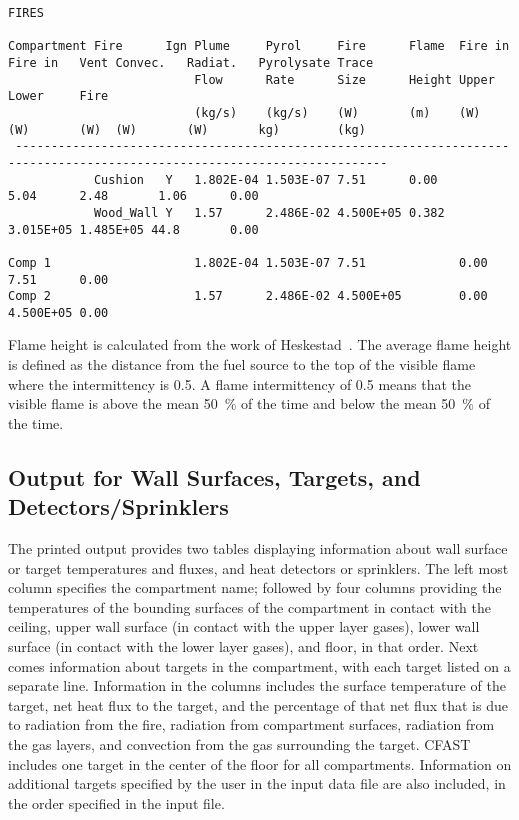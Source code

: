 \begin{lstlisting}[basicstyle=\tiny]
FIRES

Compartment Fire      Ign Plume     Pyrol     Fire      Flame  Fire in Fire in   Vent Convec.   Radiat.   Pyrolysate Trace
                          Flow      Rate      Size      Height Upper   Lower     Fire
                          (kg/s)    (kg/s)    (W)       (m)    (W)     (W)       (W)  (W)       (W)       kg)        (kg)
 --------------------------------------------------------------------------------------------------------------------------
            Cushion   Y   1.802E-04 1.503E-07 7.51      0.00                          5.04      2.48       1.06      0.00
            Wood_Wall Y   1.57      2.486E-02 4.500E+05 0.382                         3.015E+05 1.485E+05 44.8       0.00

Comp 1                    1.802E-04 1.503E-07 7.51             0.00    7.51      0.00
Comp 2                    1.57      2.486E-02 4.500E+05        0.00    4.500E+05 0.00
\end{lstlisting}
Flame height is calculated from the work of Heskestad~\cite{Heskestad:2002}. The average flame height is defined as the distance from the fuel source to the top of the visible flame where the intermittency is 0.5.  A flame intermittency of 0.5 means that the visible flame is above the mean 50~\% of the time and below the mean 50~\% of the time.

\subsection{Output for Wall Surfaces, Targets, and Detectors/Sprinklers}

The printed output provides two tables displaying information about wall surface or target temperatures and fluxes, and heat detectors or sprinklers. The left most column specifies the compartment name; followed by four columns providing the temperatures of the bounding surfaces of the compartment in contact with the ceiling, upper wall surface (in contact with the upper layer gases), lower wall surface (in contact with the lower layer gases), and floor, in that order. Next comes information about targets in the compartment, with each target listed on a separate line.  Information in the columns includes the surface temperature of the target, net heat flux to the target, and the percentage of that net flux that is due to radiation from the fire, radiation from compartment surfaces, radiation from the gas layers, and convection from the gas surrounding the target.  CFAST includes one target in the center of the floor for all compartments. Information on additional targets specified by the user in the input data file are also included, in the order specified in the input file.


